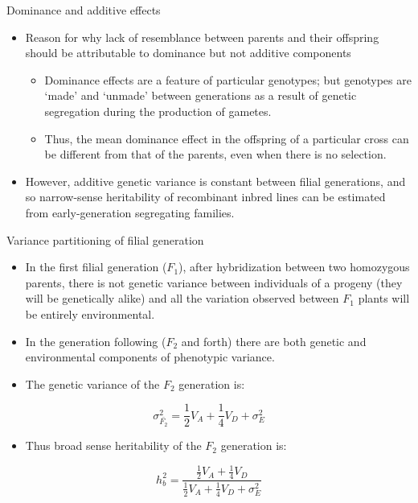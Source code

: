\documentclass[11pt,dvipsnames,ignorenonframetext,aspectratio=169]{beamer}
\providecommand{\tightlist}{%
  \setlength{\itemsep}{0pt}\setlength{\parskip}{0pt}}
\begin{document}
\begin{frame}{Dominance and additive effects}
\protect\hypertarget{dominance-and-additive-effects}{}

\begin{itemize}
\tightlist
\item
  Reason for why lack of resemblance between parents and their offspring
  should be attributable to dominance but not additive components

  \begin{itemize}
  \tightlist
  \item
    Dominance effects are a feature of particular genotypes; but
    genotypes are `made' and `unmade' between generations as a result of
    genetic segregation during the production of gametes.
  \item
    Thus, the mean dominance effect in the offspring of a particular
    cross can be different from that of the parents, even when there is
    no selection.
  \end{itemize}
\item
  However, additive genetic variance is constant between filial
  generations, and so narrow-sense heritability of recombinant inbred
  lines can be estimated from early-generation segregating families.
\end{itemize}

\end{frame}

\begin{frame}{Variance partitioning of filial generation}
\protect\hypertarget{variance-partitioning-of-filial-generation}{}

\begin{itemize}
\tightlist
\item
  In the first filial generation (\(F_1\)), after hybridization between
  two homozygous parents, there is not genetic variance between
  individuals of a progeny (they will be genetically alike) and all the
  variation observed between \(F_1\) plants will be entirely
  environmental.
\item
  In the generation following (\(F_2\) and forth) there are both genetic
  and environmental components of phenotypic variance.
\item
  The genetic variance of the \(F_2\) generation is:
\end{itemize}

\[
\sigma_{\bar{F_2}}^2 = \frac{1}{2}V_A + \frac{1}{4}V_D + \sigma_E^2
\]

\begin{itemize}
\tightlist
\item
  Thus broad sense heritability of the \(F_2\) generation is:
\end{itemize}

\[
h_b^2 = \frac{\frac{1}{2}V_A + \frac{1}{4}V_D}{\frac{1}{2}V_A + \frac{1}{4}V_D + \sigma_E^2}
\tag{iii}
\]

\end{frame}
\end{document}
